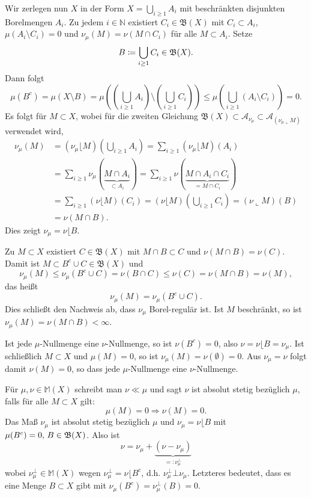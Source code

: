 \documentclass[a4paper,twoside,DIV15,BCOR12mm]{scrbook}
\newcommand{\borel}{\mathfrak B}
\newcommand{\MR}{\lfloor}
\begin{document}
\begin{beweis}
Wir zerlegen nun $X$ in der Form $X=\bigcup_{i\ge 1}A_i$ mit beschränkten disjunkten Borelmengen $A_i$. 
Zu jedem $i\in\mathbb{N}$ existiert $C_i\in \borel(X)$ mit $C_i\subset A_i$, $\mu(A_i\setminus C_i)=0$ und  $\nu_\mu(M)=\nu(M\cap C_i)$ für alle $M\subset A_i$. Setze 
$$B\da \bigcup_{i\ge 1}C_i\in \borel(X).$$
Dann folgt
$$
\mu(B^c)=\mu(X\setminus B)=\mu((\bigcup_{i\ge 1}A_i) \setminus(\bigcup_{i\ge 1}C_i))\le\mu(\bigcup_{i\ge 1}(A_i\setminus C_i))=0.
$$
Es folgt für $M\subset X$, wobei für die zweiten Gleichung $\borel (X)\subset\mathcal{A}_{\nu_\mu}\subset
\mathcal{A}_{(\nu_\mu\llcorner M)}$ verwendet wird,
\begin{align*}
\nu_\mu(M)&=(\nu_\mu\MR M)(\bigcup_{i\ge 1}A_i)=\sum_{i\ge 1}(\nu_\mu\MR M)(A_i)\\
&=\sum_{i\ge 1}\nu_\mu(\underbrace{M\cap A_i}_{\subset A_i})=\sum_{i\ge 1}\nu(\underbrace{M\cap A_i\cap C_i}_{=M\cap C_i})\\
&=\sum_{i\ge 1}(\nu\MR M)(C_i)=(\nu\MR M)(\bigcup_{i\ge 1} C_i)=(\nu\llcorner M)(B)\\
&=\nu(M\cap B).
\end{align*}
Dies zeigt $\nu_\mu=\nu\MR B$.

Zu $M\subset X$ existiert $C\in\borel (X)$ mit $M\cap B\subset C$ und $\nu(M\cap B)=\nu(C)$. Damit ist 
$M\subset B^c\cup C\in \borel(X)$ und
$$
\nu_\mu(M)\le \nu_\mu(B^c\cup C)=\nu(B\cap C)\le\nu(C)=\nu(M\cap B)=\nu(M),
$$
das heißt
$$
\nu_\mu(M)=\nu_\mu(B^c\cup C).
$$
Dies schließt den Nachweis ab, dass $\nu_\mu$ Borel-regulär ist. Ist  $M$ beschränkt, 
so ist $\nu_\mu(M)=\nu(M\cap B)<\infty$. 

Ist jede $\mu$-Nullmenge eine $\nu$-Nullmenge, so ist $\nu(B^c)=0$, 
also $\nu=\nu\MR B=\nu_\mu$. Ist schließlich $M\subset X$ und $\mu(M)=0$, so ist 
$\nu_\mu(M)=\nu(\emptyset)=0$. Aus $\nu_\mu=\nu$ folgt damit $\nu(M)=0$, so dass jede $\mu$-Nullmenge  eine $\nu$-Nullmenge.
\end{beweis}

\begin{bemerkung}
Für \(\mu, \nu \in \mathbb{M}(X)\) schreibt man \(\nu \ll \mu\) und sagt \(\nu\) ist absolut stetig bezüglich \(\mu\), falls für alle \(M \subset X\) gilt: 
\[
\mu(M) = 0 \Rightarrow \nu(M) = 0.
\]
Das Maß \(\nu_\mu\) ist absolut stetig bezüglich \(\mu\) und \(\nu_\mu = \nu\MR B\) mit \(\mu(B^c) = 0,$ $B \in \borel(X)\). Also ist
\[
\nu = \nu_\mu + \underbrace{(\nu - \nu_\mu)}_{=: \nu_\mu^\bot}
\]
wobei \(\nu_\mu^\bot \in \mathbb{M}(X)\) wegen \(\nu_\mu^\bot = \nu\MR B^c\), d.h. \(\nu_\mu^\bot \bot \nu_\mu \). 
Letzteres bedeutet, dass es eine Menge $B\subset X$ gibt mit \(\nu_\mu(B^c) = \nu_\mu^\bot(B) = 0\).
\end{bemerkung}
\end{document}
